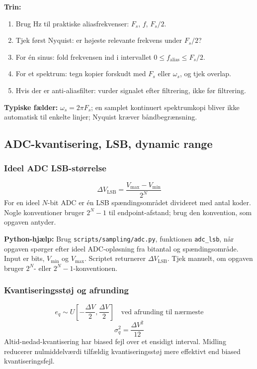 \textbf{Trin:}
\begin{enumerate}
    \item Brug Hz til praktiske aliasfrekvenser: \(F_s\), \(f\), \(F_s/2\).
    \item Tjek først Nyquist: er højeste relevante frekvens under \(F_s/2\)?
    \item For én sinus: fold frekvensen ind i intervallet \(0\le f_{\mathrm{alias}}\le F_s/2\).
    \item For et spektrum: tegn kopier forskudt med \(F_s\) eller \(\omega_s\), og tjek overlap.
    \item Hvis der er anti-aliasfilter: vurder signalet efter filtrering, ikke før filtrering.
\end{enumerate}

\textbf{Typiske fælder:} \(\omega_s=2\pi F_s\); en samplet kontinuert spektrumkopi bliver ikke automatisk til enkelte linjer; Nyquist kræver båndbegrænsning.

\subsection{ADC-kvantisering, LSB, dynamic range}

\subsubsection{Ideel ADC LSB-størrelse}
\[
\Delta V_{\mathrm{LSB}}=\frac{V_{\max}-V_{\min}}{2^N}
\]
For en ideel \(N\)-bit ADC er én LSB spændingsområdet divideret med antal koder. Nogle konventioner bruger \(2^N-1\) til endpoint-afstand; brug den konvention, som opgaven antyder.

\textbf{Python-hjælp:} Brug \texttt{scripts/sampling/adc.py}, funktionen \texttt{adc\_lsb}, når opgaven spørger efter ideel ADC-opløsning fra bitantal og spændingsområde. Input er bits, \(V_{\min}\) og \(V_{\max}\). Scriptet returnerer \(\Delta V_{\mathrm{LSB}}\). Tjek manuelt, om opgaven bruger \(2^N\)- eller \(2^N-1\)-konventionen.

\subsubsection{Kvantiseringsstøj og afrunding}
\[
e_q\sim U\left[-\frac{\Delta V}{2},\frac{\Delta V}{2}\right]\quad\text{ved afrunding til nærmeste}
\]
\[
\sigma_q^2=\frac{\Delta V^2}{12}
\]
Altid-nedad-kvantisering har biased fejl over et ensidigt interval. Midling reducerer nulmiddelværdi tilfældig kvantiseringsstøj mere effektivt end biased kvantiseringsfejl.

